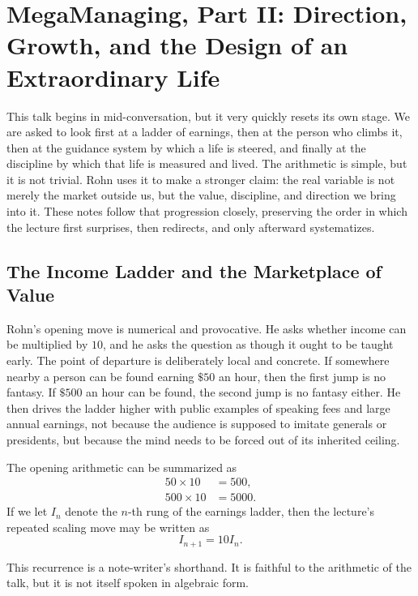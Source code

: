 \chapter{MegaManaging, Part II: Direction, Growth, and the Design of an Extraordinary Life}

This talk begins in mid-conversation, but it very quickly resets its own stage. We are asked to look first at a ladder of earnings, then at the person who climbs it, then at the guidance system by which a life is steered, and finally at the discipline by which that life is measured and lived. The arithmetic is simple, but it is not trivial. Rohn uses it to make a stronger claim: the real variable is not merely the market outside us, but the value, discipline, and direction we bring into it. These notes follow that progression closely, preserving the order in which the lecture first surprises, then redirects, and only afterward systematizes.

\section{The Income Ladder and the Marketplace of Value}

Rohn's opening move is numerical and provocative. He asks whether income can be multiplied by \(10\), and he asks the question as though it ought to be taught early. The point of departure is deliberately local and concrete. If somewhere nearby a person can be found earning \(\$50\) an hour, then the first jump is no fantasy. If \(\$500\) an hour can be found, the second jump is no fantasy either. He then drives the ladder higher with public examples of speaking fees and large annual earnings, not because the audience is supposed to imitate generals or presidents, but because the mind needs to be forced out of its inherited ceiling.

The opening arithmetic can be summarized as
\begin{align}
50 \times 10 &= 500,\\
500 \times 10 &= 5000.
\end{align}
If we let \(I_n\) denote the \(n\)-th rung of the earnings ladder, then the lecture's repeated scaling move may be written as
\begin{equation}
I_{n+1}=10I_n.
\end{equation}

\begin{remark}
This recurrence is a note-writer's shorthand. It is faithful to the arithmetic of the talk, but it is not itself spoken in algebraic form.
\end{remark}

